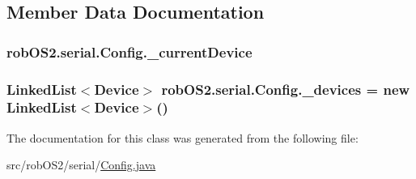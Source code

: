 \subsection{Member Data Documentation}
\hypertarget{classrob_o_s2_1_1serial_1_1_config_a9973bd83d16badea8a822f7f73a03783}{
\subsubsection[{\_\-currentDevice}]{ {\bf robOS2.serial.Config.\_\-currentDevice}}}
\label{classrob_o_s2_1_1serial_1_1_config_a9973bd83d16badea8a822f7f73a03783}
\hypertarget{classrob_o_s2_1_1serial_1_1_config_afafb54da39f788da9548e1bc957a44b6}{
\subsubsection[{\_\-devices}]{\setlength{\rightskip}{0pt plus 5cm}LinkedList$<${\bf Device}$>$ {\bf robOS2.serial.Config.\_\-devices} = new LinkedList$<${\bf Device}$>$()}}
\label{classrob_o_s2_1_1serial_1_1_config_afafb54da39f788da9548e1bc957a44b6}


The documentation for this class was generated from the following file:\begin{DoxyCompactItemize}
\item 
src/robOS2/serial/\hyperlink{_config_8java}{Config.java}\end{DoxyCompactItemize}
